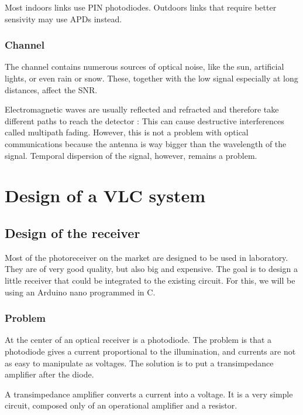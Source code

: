 \documentclass[12pt]{report}
\begin{document}
Most indoors links use PIN photodiodes. Outdoors links that require better sensivity may use APDs instead.

\section{Channel}

The channel contains numerous sources of optical noise, like the sun, artificial lights, or even rain or snow. These, together with the low signal especially at long distances, affect the SNR.

Electromagnetic waves are usually reflected and refracted and therefore take different paths to reach the detector : This can cause destructive interferences called multipath fading. However, this is not a problem with optical communications because the antenna is way bigger than the wavelength of the signal. Temporal dispersion of the signal, however, remains a problem.













\part{Design of a VLC system}

\chapter{Design of the receiver}

Most of the photoreceiver on the market are designed to be used in laboratory. They are of very good quality, but also big and expensive. The goal is to design a little receiver that could be integrated to the existing circuit.
For this, we will be using an Arduino nano programmed in C.

\section{Problem}

At the center of an optical receiver is a photodiode. The problem is that a photodiode gives a current proportional to the illumination, and currents are not as easy to manipulate as voltages. The solution is to put a transimpedance amplifier after the diode.

A transimpedance amplifier converts a current into a voltage. It is a very simple circuit, composed only of an operational amplifier and a resistor.
\end{document}
